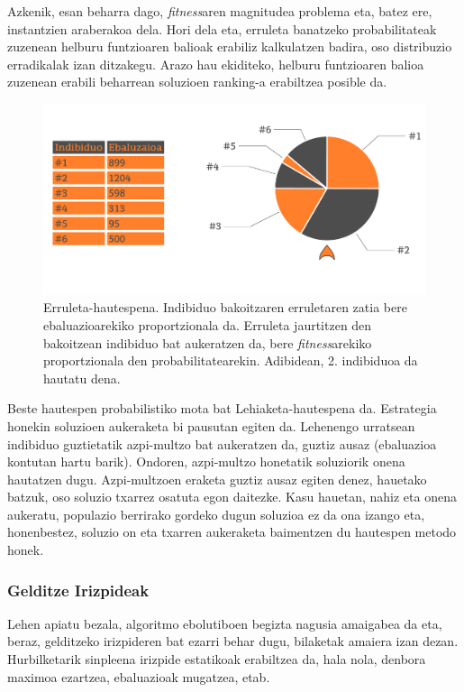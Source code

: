 \documentclass[eu]{ifirak}\usepackage[]{graphicx}\usepackage[]{color}
\newcommand{\eng}[1]{\textit{#1}}
\begin{document}
Azkenik, esan beharra dago, \eng{fitness}aren magnitudea problema eta, batez ere, instantzien araberakoa dela. Hori dela eta, erruleta banatzeko probabilitateak zuzenean helburu funtzioaren balioak erabiliz kalkulatzen badira, oso distribuzio erradikalak izan ditzakegu. Arazo hau ekiditeko, helburu funtzioaren balioa zuzenean erabili beharrean soluzioen ranking-a erabiltzea posible da.

\begin{figure}[t]
\centering
\includegraphics[width=0.7\linewidth]{./Irudiak/roulette}
\caption{Erruleta-hautespena. Indibiduo bakoitzaren erruletaren zatia bere ebaluazioarekiko proportzionala da. Erruleta jaurtitzen den bakoitzean indibiduo bat aukeratzen da, bere \eng{fitness}arekiko proportzionala den probabilitatearekin. Adibidean, 2. indibiduoa da hautatu dena.}
\label{fig:roulette}
\end{figure}

Beste hautespen probabilistiko mota bat Lehiaketa-hautespena da. Estrategia honekin soluzioen aukeraketa bi pausutan egiten da. Lehenengo urratsean indibiduo guztietatik azpi-multzo bat aukeratzen da, guztiz ausaz (ebaluazioa kontutan hartu barik). Ondoren, azpi-multzo honetatik soluziorik onena hautatzen dugu. Azpi-multzoen eraketa guztiz ausaz egiten denez, hauetako batzuk, oso soluzio txarrez osatuta egon daitezke. Kasu hauetan, nahiz eta onena aukeratu, populazio berrirako gordeko dugun soluzioa ez da ona izango eta, honenbestez, soluzio on eta txarren aukeraketa baimentzen du hautespen metodo honek. 

\subsubsection{Gelditze Irizpideak}

Lehen apiatu bezala, algoritmo ebolutiboen begizta nagusia amaigabea da eta, beraz, gelditzeko irizpideren bat ezarri behar dugu, bilaketak amaiera izan dezan. Hurbilketarik sinpleena irizpide estatikoak erabiltzea da, hala nola, denbora maximoa ezartzea, ebaluazioak mugatzea, etab.
\end{document}
